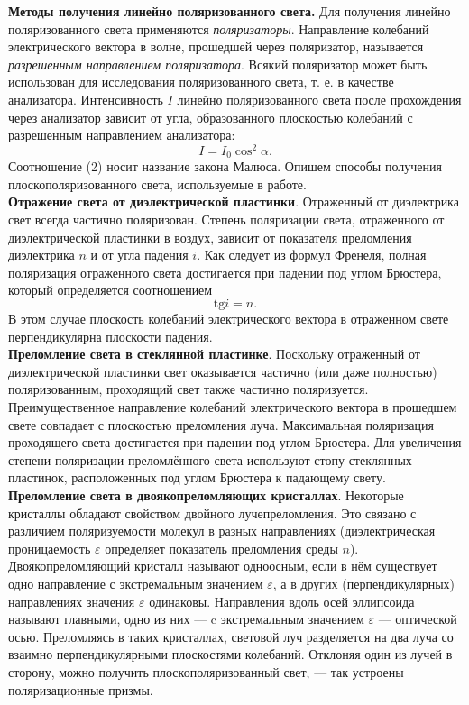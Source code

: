 \textbf{Методы получения линейно поляризованного света.} Для получения линейно поляризованного света применяются \textit{поляризаторы}. Направление колебаний электрического вектора в волне, прошедшей через поляризатор, называется \textit{разрешенным направлением поляризатора}. Всякий поляризатор может быть использован для исследования поляризованного света, т. е. в качестве анализатора. Интенсивность $I$ линейно поляризованного света после прохождения через анализатор зависит от угла, образованного плоскостью колебаний с разрешенным направлением анализатора:
\begin{equation}
	I = I_0 \cos^2\alpha.
\end{equation}
Соотношение (2) носит название закона Малюса. Опишем способы получения плоскополяризованного света, используемые в работе. \\

\textbf{Отражение света от диэлектрической пластинки}. Отраженный от диэлектрика свет всегда частично поляризован. Степень поляризации света, отраженного от диэлектрической пластинки в воздух, зависит от показателя преломления диэлектрика $n$ и от угла падения $i$. Как следует из формул Френеля, полная поляризация отраженного света достигается при падении под углом Брюстера, который определяется соотношением
\begin{equation}
	\text{tg}i = n.
\end{equation}
В этом случае плоскость колебаний электрического вектора в отраженном свете перпендикулярна плоскости падения. \\

\textbf{Преломление света в стеклянной пластинке}. Поскольку отраженный от
диэлектрической пластинки свет оказывается частично (или даже полностью) поляризованным, проходящий свет также частично поляризуется. Преимущественное направление колебаний электрического вектора
в прошедшем свете совпадает с плоскостью преломления луча. Максимальная поляризация проходящего света достигается при падении под
углом Брюстера. Для увеличения степени поляризации преломлённого
света используют стопу стеклянных пластинок, расположенных под углом Брюстера к падающему свету. \\

\textbf{Преломление света в двоякопреломляющих кристаллах}. Некоторые кристаллы обладают свойством двойного лучепреломления. Это связано с различием поляризуемости молекул в разных направлениях (диэлектрическая проницаемость $\varepsilon$ определяет показатель преломления среды $n$).
Двоякопреломляющий кристалл называют одноосным, если в нём существует одно направление с экстремальным значением $\varepsilon$, а в других (перпендикулярных) направлениях значения $\varepsilon$ одинаковы. Направления вдоль осей эллипсоида называют главными, одно из них --- c экстремальным значением $\varepsilon$ --- оптической осью. Преломляясь в таких кристаллах, световой луч разделяется на два луча со взаимно перпендикулярными плоскостями колебаний. Отклоняя	один из лучей в сторону, можно получить плоскополяризованный свет, --- так устроены поляризационные призмы.


